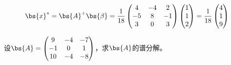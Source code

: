 \documentclass[12pt, a4paper, oneside, UTF8]{ctexbook}
\begin{document}
\begin{solution}
    \begin{align*}
        \bs{x}^*=\bs{A}^+\bs{\beta}
        =\frac{1}{18}\begin{pmatrix}
            4&-4&2\\
            -5&8&-1\\
            3&0&3 
         \end{pmatrix}\begin{pmatrix}
            1\\
            1\\
            2
           \end{pmatrix}
           =\frac{1}{18}\begin{pmatrix}
            4\\
            1\\
            9
           \end{pmatrix}
    \end{align*}
\end{solution}

\begin{question}
    设$\bs{A}=\begin{pmatrix}
        9&-4&-7\\
        -1&0&1\\
        10&-4&-8
    \end{pmatrix}$，求$\bs{A}$的谱分解。
\end{question}
\end{document}
